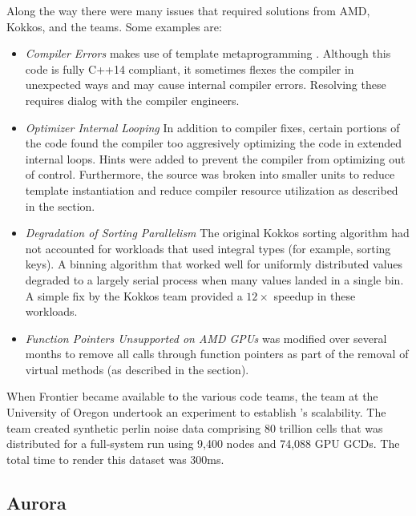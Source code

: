 Along the way there were many issues that required solutions from AMD, Kokkos, and the \vtkm teams. Some examples are:
\begin{itemize}
\item \emph{Compiler Errors}
  \vtkm makes use of template metaprogramming \cite{Meyers2005}.
  Although this code is fully C++14 compliant, it sometimes flexes the compiler in unexpected ways and may cause internal compiler errors.
  Resolving these requires dialog with the compiler engineers.
\item \emph{Optimizer Internal Looping}
  In addition to compiler fixes, certain portions of the code found the compiler too aggresively optimizing the code in extended internal loops.
  Hints were added to prevent the compiler from optimizing out of control.
  Furthermore, the \vtkm source was broken into smaller units to reduce template instantiation and reduce compiler resource utilization as described in the  section.
\item \emph{Degradation of Sorting Parallelism}
  The original Kokkos sorting algorithm had not accounted for \vtkm workloads that used integral types (for example, sorting keys).
  A binning algorithm that worked well for uniformly distributed values degraded to a largely serial process when many values landed in a single bin.
  A simple fix by the Kokkos team provided a $12\times$ speedup in these workloads.
\item \emph{Function Pointers Unsupported on AMD GPUs}
  \vtkm was modified over several months to remove all calls through function pointers as part of the removal of virtual methods (as described in the  section).
\end{itemize}

When Frontier became available to the various code teams, the \vtkm team at the University of Oregon undertook an experiment to establish \vtkm's scalability.
The team created synthetic perlin noise data comprising 80 trillion cells that was distributed for a full-system run using 9,400 nodes and 74,088 GPU GCDs.
The total time to render this dataset was 300ms.


\subsection{Aurora}

